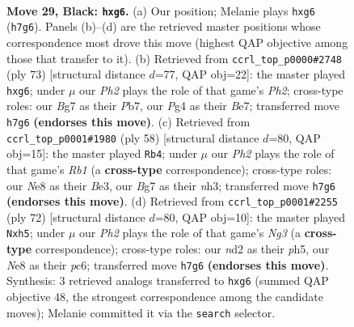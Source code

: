 \documentclass[11pt]{article}
\begin{document}
\clearpage

\begin{figure}[p]\centering
\begin{subfigure}{0.46\textwidth}\centering
\resizebox{\linewidth}{!}{%
\newchessgame
\chessboard[
  setfen={r3n3/P4kbp/1pp3P1/8/4B1pP/R7/3NR2K/2r5 b - - 0 29},
  showmover=false,
  pgfstyle=straightmove, color=movearrow, markmove={h7-g6}
]}
\caption{}
\end{subfigure}\hfill
\begin{subfigure}{0.46\textwidth}\centering
\resizebox{\linewidth}{!}{%
\newchessgame
\chessboard[
  setfen={4k3/1p2bp1p/6P1/n7/2P5/rP2B2P/8/1R1B1K2 b - - 0 37},
  showmover=false,
  pgfstyle=straightmove, color=movearrow, markmove={h7-g6}
]}
\caption{}
\end{subfigure}
\\[4pt]
\begin{subfigure}{0.46\textwidth}\centering
\resizebox{\linewidth}{!}{%
\newchessgame
\chessboard[
  setfen={k2r2r1/5p2/P7/2R4B/3pb3/4B2n/2P1K2P/1R6 w - - 2 30},
  showmover=false,
  pgfstyle=straightmove, color=movearrow, markmove={b1-b4}
]}
\caption{}
\end{subfigure}\hfill
\begin{subfigure}{0.46\textwidth}\centering
\resizebox{\linewidth}{!}{%
\newchessgame
\chessboard[
  setfen={5r2/R7/2p1k3/6Rp/7P/5bN1/PPr2P1K/8 w - - 1 37},
  showmover=false,
  pgfstyle=straightmove, color=movearrow, markmove={g3-h5}
]}
\caption{}
\end{subfigure}
\caption{\textbf{Move 29, Black: \texttt{hxg6}.} (a) Our position; Melanie plays \texttt{hxg6} (\texttt{h7g6}). Panels (b)--(d) are the retrieved master positions whose correspondence most drove this move (highest QAP objective among those that transfer to it). (b) Retrieved from \texttt{ccrl\_top\_p0000\#2748} (ply 73) [structural distance $d$=77, QAP obj=22]: the master played \texttt{hxg6}; under $\mu$ our \emph{Ph2} plays the role of that game's \emph{Ph2}; cross-type roles: our \emph{B}g7 as their \emph{P}b7, our \emph{P}g4 as their \emph{B}e7; transferred move \texttt{h7g6} \textbf{(endorses this move)}. (c) Retrieved from \texttt{ccrl\_top\_p0001\#1980} (ply 58) [structural distance $d$=80, QAP obj=15]: the master played \texttt{Rb4}; under $\mu$ our \emph{Ph2} plays the role of that game's \emph{Rb1} (a \textbf{cross-type} correspondence); cross-type roles: our \emph{N}e8 as their \emph{B}e3, our \emph{B}g7 as their \emph{n}h3; transferred move \texttt{h7g6} \textbf{(endorses this move)}. (d) Retrieved from \texttt{ccrl\_top\_p0001\#2255} (ply 72) [structural distance $d$=80, QAP obj=10]: the master played \texttt{Nxh5}; under $\mu$ our \emph{Ph2} plays the role of that game's \emph{Ng3} (a \textbf{cross-type} correspondence); cross-type roles: our \emph{n}d2 as their \emph{p}h5, our \emph{N}e8 as their \emph{p}c6; transferred move \texttt{h7g6} \textbf{(endorses this move)}. Synthesis: 3 retrieved analogs transferred to \texttt{hxg6} (summed QAP objective 48, the strongest correspondence among the candidate moves); Melanie committed it via the \texttt{search} selector.}
\label{fig:thought-m57}
\end{figure}
\end{document}

